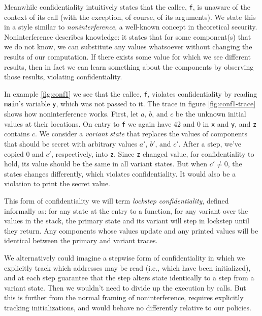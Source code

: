 \documentclass[acmsmall,review,anonymous]{acmart}\settopmatter{printfolios=true,printccs=false,printacmref=false}
\begin{document}
Meanwhile confidentiality intuitively states that the callee, {\tt f}, is unaware
of the context of its call (with the exception, of course, of its arguments).
We state this in a style similar to {\em noninterference}, a well-known concept in theoretical
security. Noninterference describes knowledge: it states that for some component(s)
that we do not know, we can substitute any values whatsoever without changing the results
of our computation. If there exists some value for which we see different results, then
in fact we can learn something about the components by observing those results, violating
confidentiality.

In example \ref{fig:conf1} we see that the callee, {\tt f}, violates confidentiality
by reading {\tt main}'s variable {\tt y}, which was not passed to it. The trace
in figure \ref{fig:conf1-trace} shows how noninterference works. First, let \(a\),
\(b\), and \(c\) be the unknown initial values at their locations. On entry to {\tt f}
we again have 42 and 0 in {\tt x} and {\tt y}, and {\tt z} contains \(c\). We consider a
{\em variant state} that replaces the values of components that should be secret with
arbitrary values \(a'\), \(b'\), and \(c'\). After a step, we've copied 0 and \(c'\),
respectively, into {\tt z}. Since {\tt z} changed value, for confidentiality to hold,
its value should be the same in all variant states. But when \(c' \not = 0\), the
states changes differently, which violates confidentiality. It would also be a violation
to print the secret value.

This form of confidentiality we will term {\em lockstep confidentiality}, defined informally
as: for any state at the entry to a function, for any variant over the values in the stack,
the primary state and its variant will step in lockstep until they return. Any components
whose values update and any printed values will be identical between the primary and variant
traces.

We alternatively could imagine a stepwise form of confidentiality in which we explicitly
track which addresses may be read (i.e., which have been initialized), and at each step
guarantee that the step alters state identically to a step from a variant state. Then we
wouldn't need to divide up the execution by calls. But this is further from the normal
framing of noninterference, requires explicitly tracking initializations, and would behave
no differently relative to our policies.
\end{document}
